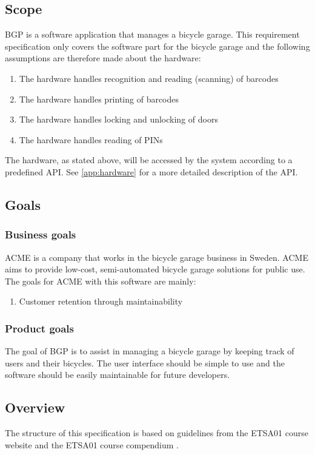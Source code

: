 \documentclass[12pt,titlepage,bibliography=totoc]{article}
\begin{document}
\subsection{Scope}
BGP is a software application that manages a bicycle garage. This requirement specification only covers the software part for the bicycle garage and the following assumptions are therefore made about the hardware:
\begin{enumerate}
	\item The hardware handles recognition and reading (scanning) of barcodes
	\item The hardware handles printing of barcodes
	\item The hardware handles locking and unlocking of doors
	\item The hardware handles reading of PINs
\end{enumerate}
The hardware, as stated above, will be accessed by the system according to a predefined API. See \cref{app:hardware} for a more detailed description of the API.

\subsection{Goals}
\subsubsection{Business goals}
ACME is a company that works in the bicycle garage business in Sweden. ACME aims to provide low-cost, semi-automated bicycle garage solutions for public use. The goals for ACME with this software are mainly:
\begin{enumerate}
	\item Customer retention through maintainability
\end{enumerate}
\subsubsection{Product goals}
The goal of BGP is to assist in managing a bicycle garage by keeping track of users and their bicycles. The user interface should be simple to use and the software should be easily maintainable for future developers.

\subsection{Overview}
The structure of this specification is based on guidelines from the ETSA01 course website and the ETSA01 course compendium \cite{kompendium,course-site}.
\end{document}
